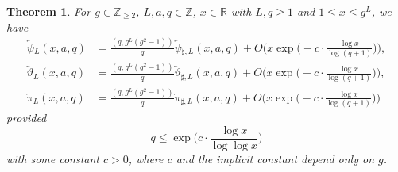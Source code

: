 \documentclass[hidelinks]{amsart}
\numberwithin{equation}{section}
\theoremstyle{plain}
\newtheorem{theorem}{Theorem}
\theoremstyle{definition}
\newcommand{\arev}{\overleftarrow}
\begin{document}
\begin{theorem}
\label{thm:rev_psi_theta_pi_L}
For $g\in\mathbb{Z}_{\ge2}$, $L,a,q\in\mathbb{Z}$, $x\in\mathbb{R}$
with $L,q\ge1$ and $1\le x\le g^{L}$,
we have
\begin{align}
\label{thm:rev_psi_theta_pi_L:psi}
\arev{\psi}\!_{L}(x,a,q)
&=
\frac{(q,g^{L}(g^{2}-1))}{q}
\arev{\psi}\!_{\sharp,L}(x,a,q)
+
O\biggl(x\exp\biggl(-c\cdot\frac{\log x}{\log(q+1)}\biggr)\biggr),\\[2mm]
\label{thm:rev_psi_theta_pi_L:theta}
\arev{\vartheta}\!_{L}(x,a,q)
&=
\frac{(q,g^{L}(g^{2}-1))}{q}
\arev{\vartheta}\!_{\sharp,L}(x,a,q)
+
O\biggl(x\exp\biggl(-c\cdot\frac{\log x}{\log(q+1)}\biggr)\biggr),\\[2mm]
\label{thm:rev_psi_theta_pi_L:pi}
\arev{\pi}\!_{L}(x,a,q)
&=
\frac{(q,g^{L}(g^{2}-1))}{q}
\arev{\pi}\!_{\sharp,L}(x,a,q)
+
O\biggl(x\exp\biggl(-c\cdot\frac{\log x}{\log(q+1)}\biggr)\biggr)
\end{align}
provided
\begin{equation}
\label{thm:rev_psi_theta_pi_L:q_range}
q\le\exp\biggl(c\cdot\frac{\log x}{\log\log x}\biggr)
\end{equation}
with some constant $c>0$,
where $c$ and the implicit constant depend only on $g$.
\end{theorem}
\end{document}
